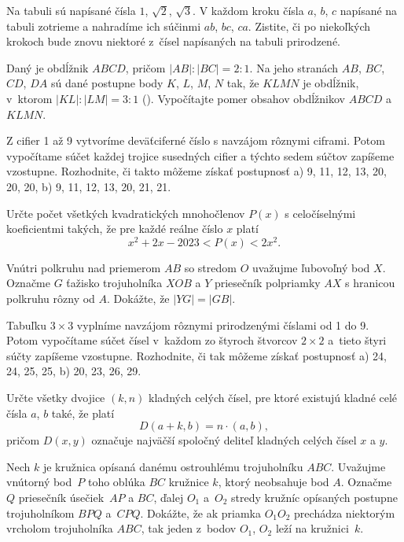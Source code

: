 {%
Na tabuli sú napísané čísla $1$, $\sqrt{2}$, $\sqrt{3}$. V každom kroku čísla $a$, $b$, $c$ napísané na tabuli zotrieme a nahradíme ich súčinmi $ab$, $bc$, $ca$. Zistite, či po niekoľkých krokoch bude znovu niektoré z~čísel napísaných na tabuli prirodzené.}

{%
Daný je obdĺžnik $ABCD$, pričom ${|AB|:|BC|}=2:1$. Na jeho stranách $AB$, $BC$, $CD$, $DA$ sú dané postupne body $K$, $L$, $M$, $N$ tak, že $KLMN$ je obdĺžnik, v~ktorom $|KL|:|LM|=3:1$ (\obr). Vypočítajte pomer obsahov obdĺžnikov $ABCD$ a $KLMN$.
}

{%
Z cifier 1 až 9 vytvoríme deväťciferné číslo s navzájom rôznymi ciframi. Potom vypočítame súčet každej trojice susedných cifier a týchto sedem súčtov zapíšeme vzostupne. Rozhodnite, či takto môžeme získať postupnosť
\ite a) 9, 11, 12, 13, 20, 20, 20,
\ite b) 9, 11, 12, 13, 20, 21, 21.
}

{%
Určte počet všetkých kvadratických mnohočlenov $P(x)$ s celočíselnými koeficientmi takých, že pre každé reálne číslo $x$ platí
$$
x^2 + 2x - 2023 < P(x) < 2x^2.
$$
}

{%
Vnútri polkruhu nad priemerom $AB$ so stredom $O$ uvažujme ľubovoľný bod $X$.
Označme $G$ ťažisko trojuholníka $XOB$ a $Y$ priesečník polpriamky $AX$ s hranicou polkruhu rôzny od $A$.
Dokážte, že $|YG|=|GB|$.}

{%
Tabuľku $3\times 3$ vyplníme navzájom rôznymi prirodzenými číslami od 1 do 9. Potom vypočítame súčet čísel v~každom zo štyroch štvorcov $2\times 2$ a~tieto štyri súčty zapíšeme vzostupne. Rozhodnite, či tak môžeme získať postupnosť
\ite a) 24, 24, 25, 25,
\ite b) 20, 23, 26, 29.
}

{%
Určte všetky dvojice $(k,n)$ kladných celých čísel, pre ktoré existujú kladné celé čísla $a$, $b$ také, že platí
$$
D(a+k, b) = n\cdot(a, b),
$$
pričom $D(x,y)$ označuje najväčší spoločný deliteľ kladných celých čísel $x$ a $y$.
}

{%
Nech $k$ je kružnica opísaná danému ostrouhlému trojuholníku $ABC$. Uvažujme vnútorný bod~$P$ toho oblúka $BC$ kružnice $k$, ktorý neobsahuje bod $A$. Označme $Q$ priesečník úsečiek~$AP$ a $BC$, ďalej $O_1$ a~$O_2$ stredy kružníc opísaných postupne trojuholníkom $BPQ$ a~$CPQ$. Dokážte, že ak priamka $O_1O_2$ prechádza niektorým vrcholom trojuholníka $ABC$, tak jeden z~bodov $O_1$, $O_2$ leží na kružnici~$k$.}

